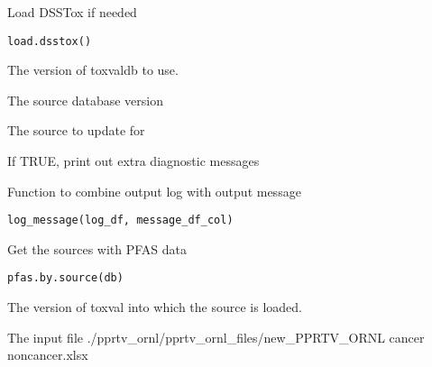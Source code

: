 \documentclass[letterpaper]{book}
\begin{document}
%
\begin{Description}\relax
Load DSSTox if needed
\end{Description}
%
\begin{Usage}
\begin{verbatim}
load.dsstox()
\end{verbatim}
\end{Usage}
%
\begin{Arguments}
\begin{ldescription}
\item[\code{toxval.db}] The version of toxvaldb to use.

\item[\code{source.db}] The source database version

\item[\code{source}] The source to update for

\item[\code{verbose}] If TRUE, print out extra diagnostic messages
\end{ldescription}
\end{Arguments}
%
\begin{Description}\relax
Function to combine output log with output message
\end{Description}
%
\begin{Usage}
\begin{verbatim}
log_message(log_df, message_df_col)
\end{verbatim}
\end{Usage}
%
\begin{Description}\relax
Get the sources with PFAS data
\end{Description}
%
\begin{Usage}
\begin{verbatim}
pfas.by.source(db)
\end{verbatim}
\end{Usage}
%
\begin{Arguments}
\begin{ldescription}
\item[\code{db}] The version of toxval into which the source is loaded.

\item[\code{infile}] The input file ./pprtv\_ornl/pprtv\_ornl\_files/new\_PPRTV\_ORNL cancer noncancer.xlsx
\end{ldescription}
\end{Arguments}
\end{document}
